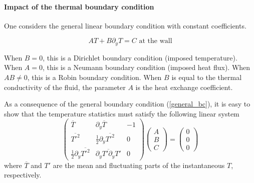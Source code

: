 \documentclass[review]{elsarticle}
\begin{document}
\paragraph{Impact of the thermal boundary condition} One considers the general linear boundary condition with constant coefficients.%

\begin{equation}\label{general_bc}A T + B \partial_y T = C \mbox{ at the wall} \end{equation}

When $B=0$, this is a Dirichlet boundary condition (imposed temperature). When $A=0$, this is a Neumann boundary condition (imposed heat flux). When $AB \neq 0$, this is a Robin boundary condition. When $B$ is equal to the thermal conductivity of the fluid, the parameter $A$ is the heat exchange coefficient.%

As a consequence of the general boundary condition (\ref{general_bc}), it is easy to show that the temperature statistics must satisfy the following linear system %
\begin{equation}\label{system}\begin{pmatrix}
\overline{T} & \partial_y\overline{T} & -1 \\
\overline{T'^2} & \tfrac{1}{2}\partial_y \overline{T'^2}  & 0 \\
\tfrac{1}{2}\partial_y \overline{T'^2} & \overline{\partial_y T' \partial_y T'} & 0
\end{pmatrix}
\begin{pmatrix}
A \\
B \\
C
\end{pmatrix}
=
\begin{pmatrix}
0 \\
0 \\
0
\end{pmatrix}\end{equation}
where $\overline{T}$ and $T'$ are the mean and fluctuating parts of the instantaneous $T$, respectively.
\end{document}
